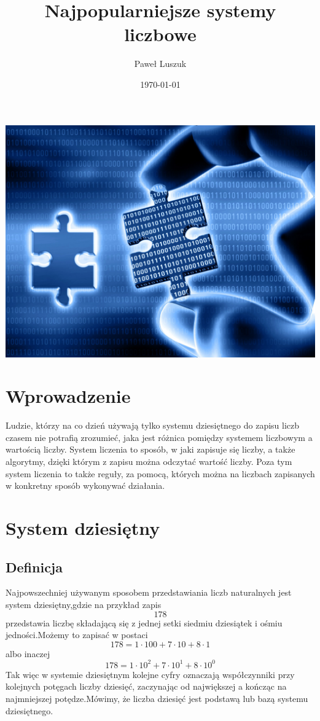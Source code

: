 \documentclass[12pt]{article}
\begin{document}
\title{Najpopularniejsze systemy liczbowe}
\author{Paweł Luszuk}
\date{\today}
\maketitle
\setcounter{tocdepth}{2} %
\begin{center}
\includegraphics[scale=0.25]{jpg3.jpg}
\end{center}

\newpage
\begin{flushleft}

\tableofcontents
\end{flushleft}


\newpage
\section{Wprowadzenie}
Ludzie, którzy na co dzień używają tylko systemu dziesiętnego do zapisu liczb czasem nie potrafią zrozumieć, jaka jest różnica pomiędzy systemem liczbowym a wartością liczby. System liczenia to sposób, w jaki zapisuje się liczby, a także algorytmy, dzięki którym z zapisu można odczytać wartość liczby. Poza tym system liczenia to także reguły, za pomocą, których można na liczbach zapisanych w konkretny sposób wykonywać działania.


\section{System dziesiętny}
\subsection{Definicja}
Najpowszechniej używanym sposobem przedstawiania liczb naturalnych jest system dziesiętny,gdzie na przykład zapis $$178$$ przedstawia liczbę składającą się z jednej setki siedmiu dziesiątek i ośmiu jedności.Możemy to zapisać w postaci $$178=1\cdot100+7\cdot10+8\cdot1$$ albo inaczej $$178=1\cdot10^2+7\cdot10^1+8\cdot10^0$$Tak więc w systemie dziesiętnym kolejne cyfry oznaczają współczynniki przy kolejnych potęgach liczby dziesięć, zaczynając od największej a kończąc na najmniejszej potędze.Mówimy, że liczba dziesięć jest podstawą lub bazą systemu dziesiętnego.
\end{document}
